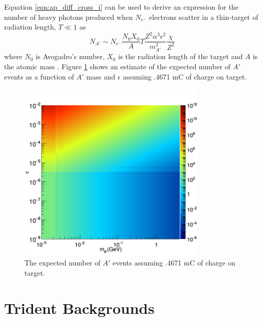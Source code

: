 Equation \ref{eqn:ap_diff_cross_i} can be used to derive an expression for the
number of heavy photons produced when $N_{e^-}$ electrons scatter in a
thin-target of radiation length, $T \ll 1$ as  
\begin{equation}
        N_{A'} \sim N_{e^-}\frac{N_0X_0}{A}T\frac{Z^2\alpha^3\epsilon^2}{m_{A'}^2}\frac{\chi}{Z^2}
\end{equation}
where $N_0$ is Avogadro's number, $X_0$ is the radiation length of the target
and $A$ is the atomic mass \cite{Bjorken:2009mm}.  Figure \ref{fig:ap_rate} shows
an estimate of the expected number of $A'$ events as a function of $A'$ mass 
and $\epsilon$ assuming .4671 mC of charge on target.
\begin{figure}[t]
    \centering
    \includegraphics[width=0.8\textwidth]{images/20160517_rate.png}
    \caption{The expected number of $A'$ events assuming .4671 mC of charge
             on target.}
    \label{fig:ap_rate}
\end{figure}  

\section{Trident Backgrounds} \label{sec:tri_bkgs}

